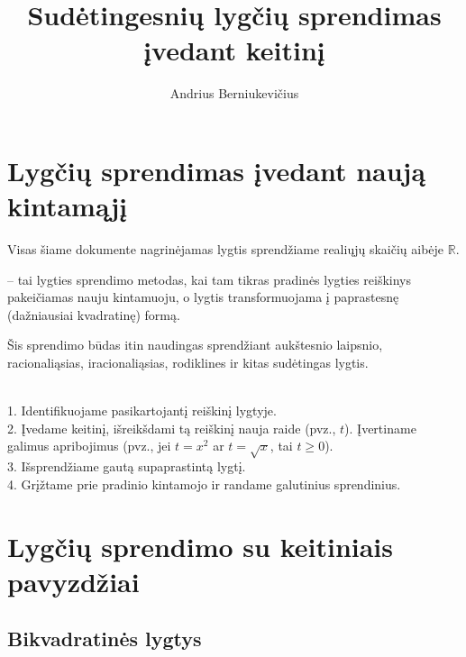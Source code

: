 \documentclass[11pt,a4paper]{scrartcl}
\title{Sudėtingesnių lygčių sprendimas įvedant keitinį}
\author{Andrius Berniukevičius}
\begin{document}
\maketitle

\section{Lygčių sprendimas įvedant naują kintamąjį}

Visas šiame dokumente nagrinėjamas lygtis sprendžiame realiųjų skaičių aibėje \(\mathbb{R}\).

\begin{definition}
 -- tai lygties sprendimo metodas, kai tam tikras pradinės lygties reiškinys pakeičiamas nauju kintamuoju, o lygtis transformuojama į paprastesnę (dažniausiai kvadratinę) formą.
\end{definition}

Šis sprendimo būdas itin naudingas sprendžiant aukštesnio laipsnio, racionaliąsias, iracionaliąsias, rodiklines ir kitas sudėtingas lygtis. 

\begin{algorithm}
\leavevmode\\
1. Identifikuojame pasikartojantį reiškinį lygtyje.\\
2. Įvedame keitinį, išreikšdami tą reiškinį nauja raide (pvz., \(t\)). Įvertiname galimus apribojimus (pvz., jei \(t=x^2\) ar \(t=\sqrt{x}\), tai \(t \ge 0\)).\\
3. Išsprendžiame gautą supaprastintą lygtį.\\
4. Grįžtame prie pradinio kintamojo ir randame galutinius sprendinius.
\end{algorithm}

\section{Lygčių sprendimo su keitiniais pavyzdžiai}

\subsection{Bikvadratinės lygtys}
\end{document}
